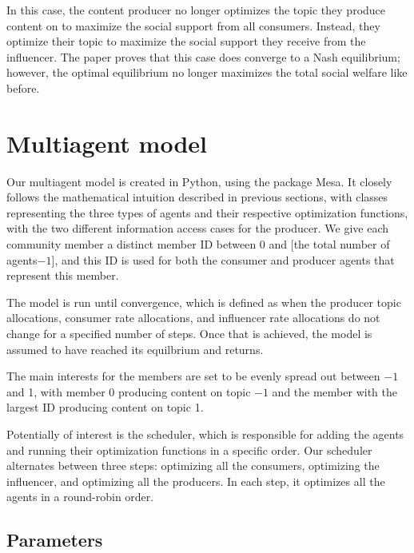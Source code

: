 \documentclass[11pt, letterpaper]{article}
\begin{document}
In this case, the content producer no longer optimizes the topic they produce content on to maximize the social support from all consumers. Instead, they optimize their topic to maximize the social support they receive from the influencer. The paper proves that this case does converge to a Nash equilibrium; however, the optimal equilibrium no longer maximizes the total social welfare like before.

\pagebreak

\section{Multiagent model}

Our multiagent model is created in Python, using the package Mesa. It closely follows the mathematical intuition described in previous sections, with classes representing the three types of agents and their respective optimization functions, with the two different information access cases for the producer. We give each community member a distinct member ID between 0 and [the total number of agents\(-1\)], and this ID is used for both the consumer and producer agents that represent this member.

The model is run until convergence, which is defined as when the producer topic allocations, consumer rate allocations, and influencer rate allocations do not change for a specified number of steps. Once that is achieved, the model is assumed to have reached its equilbrium and returns.

The main interests for the members are set to be evenly spread out between \(-1\) and 1, with member 0 producing content on topic \(-1\) and the member with the largest ID producing content on topic 1. 

Potentially of interest is the scheduler, which is responsible for adding the agents and running their optimization functions in a specific order. Our scheduler alternates between three steps: optimizing all the consumers, optimizing the influencer, and optimizing all the producers. In each step, it optimizes all the agents in a round-robin order. 

\subsection{Parameters}
\end{document}
